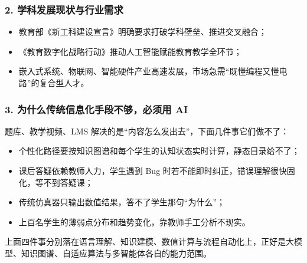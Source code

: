 \documentclass[zihao=-4,a4paper,UTF8,fontset=windows]{ctexart}
\begin{document}
\subsubsection{2. 学科发展现状与行业需求}
\begin{itemize}[leftmargin=2em,itemsep=0pt,topsep=0pt]
\item 教育部《新工科建设宣言》明确要求打破学科壁垒、推进交叉融合；
\end{itemize}
\begin{itemize}[leftmargin=2em,itemsep=0pt,topsep=0pt]
\item 《教育数字化战略行动》推动人工智能赋能教育教学全环节；
\end{itemize}
\begin{itemize}[leftmargin=2em,itemsep=0pt,topsep=0pt]
\item 嵌入式系统、物联网、智能硬件产业高速发展，市场急需“既懂编程又懂电路”的复合型人才。
\end{itemize}
\subsubsection{3. 为什么传统信息化手段不够，必须用 AI}


题库、教学视频、LMS 解决的是“内容怎么发出去”，下面几件事它们做不了：

\begin{itemize}[leftmargin=2em,itemsep=0pt,topsep=0pt]
\item 个性化路径要按知识图谱和每个学生的认知状态实时计算，静态目录给不了；
\end{itemize}
\begin{itemize}[leftmargin=2em,itemsep=0pt,topsep=0pt]
\item 课后答疑依赖教师人力，学生遇到 Bug 时若不能即时纠正，错误理解很快固化，等不到答疑课；
\end{itemize}
\begin{itemize}[leftmargin=2em,itemsep=0pt,topsep=0pt]
\item 传统仿真器只输出数值结果，答不了学生那句“为什么”；
\end{itemize}
\begin{itemize}[leftmargin=2em,itemsep=0pt,topsep=0pt]
\item 上百名学生的薄弱点分布和趋势变化，靠教师手工分析不现实。
\end{itemize}


上面四件事分别落在语言理解、知识建模、数值计算与流程自动化上，正好是大模型、知识图谱、自适应算法与多智能体各自的能力范围。
\end{document}

